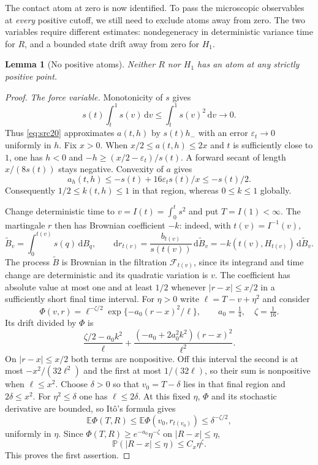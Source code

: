 \documentclass[11pt,a4paper]{article}
\numberwithin{equation}{section}
\newtheorem{lemma}[theorem]{Lemma}
\theoremstyle{definition}
\theoremstyle{remark}
\newcommand{\E}{\mathbb E}
\newcommand{\Prob}{\mathbb P}
\newcommand{\dd}{\mathrm d}
\newcommand{\eps}{\varepsilon}
\begin{document}
The contact atom at zero is now identified. To pass the microscopic
observables at \emph{every} positive cutoff, we still need to exclude
atoms away from zero. The two variables require different estimates:
nondegeneracy in deterministic variance time for $R$, and a bounded
state drift away from zero for $H_1$.

\begin{lemma}[No positive atoms]\label{crit:no-positive-atoms}
Neither $R$ nor $H_1$ has an atom at any strictly positive point.
\end{lemma}

\begin{proof}
\emph{The force variable.}
Monotonicity of $s$ gives
\[
 s(t)\int_t^1s(v)\,\dd v\le\int_t^1s(v)^2\,\dd v\longrightarrow0.
\]
Thus \eqref{eq:src20} approximates $a(t,h)$ by $s(t)h_-$ with
an error $\eps_t\to0$ uniformly in $h$.
Fix $x>0$.  When $x/2\le a(t,h)\le2x$ and $t$ is sufficiently
close to $1$, one has $h<0$ and
$-h\ge(x/2-\eps_t)/s(t)$.  A forward secant of length
$x/(8s(t))$ stays negative.  Convexity of $a$ gives
\[
 a_h(t,h)\le-s(t)+16\eps_t s(t)/x\le-s(t)/2.
\]
Consequently $1/2\le k(t,h)\le1$ in that region, whereas
$0\le k\le1$ globally.

Change deterministic time to $v=I(t)=\int_0^ts^2$ and put
$T=I(1)<\infty$.  The martingale $r$ then has Brownian coefficient
$-k$: indeed, with $t(v)=I^{-1}(v)$,
\[
 \widetilde B_v=\int_0^{t(v)}s(q)\,\dd B_q,
 \qquad \dd r_{t(v)}
       =\frac{b_{t(v)}}{s(t(v))}\,\dd\widetilde B_v
       =-k(t(v),H_{t(v)})\,\dd\widetilde B_v.
\]
The process $\widetilde B$ is Brownian in the filtration
$\mathcal F_{t(v)}$, since its integrand and time change are
deterministic and its quadratic variation is $v$.
The coefficient has absolute value at most one and at least $1/2$ whenever
$|r-x|\le x/2$ in a sufficiently short final time interval.
For $\eta>0$ write $\ell=T-v+\eta^2$ and consider
\[
 \Phi(v,r)=\ell^{-\zeta/2}
             \exp\{-a_0(r-x)^2/\ell\},
 \qquad a_0=\tfrac14,\quad\zeta=\tfrac1{16}.
\]
Its drift divided by $\Phi$ is
\[
 \frac{\zeta/2-a_0k^2}{\ell}
      +\frac{(-a_0+2a_0^2k^2)(r-x)^2}{\ell^2}.
\]
On $|r-x|\le x/2$ both terms are nonpositive.  Off this interval
the second is at most $-x^2/(32\ell^2)$ and the first at most
$1/(32\ell)$, so their sum is nonpositive when $\ell\le x^2$.
Choose $\delta>0$ so that $v_0=T-\delta$ lies in that final region
and $2\delta\le x^2$.  For $\eta^2\le\delta$ one has
$\ell\le2\delta$.  At this fixed $\eta$, $\Phi$ and its stochastic
derivative are bounded, so It\^o's formula gives
\[
 \E\Phi(T,R)\le\E\Phi(v_0,r_{t(v_0)})
                       \le\delta^{-\zeta/2},
\]
uniformly in $\eta$.
Since $\Phi(T,R)\ge e^{-a_0}\eta^{-\zeta}$ on
$|R-x|\le\eta$,
\[
 \Prob(|R-x|\le\eta)\le C_x\eta^{\zeta}.
\]
This proves the first assertion.


\end{proof}
\end{document}
